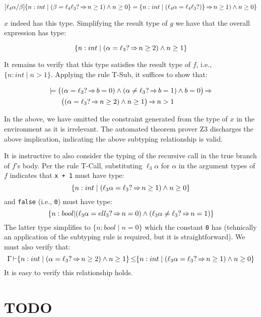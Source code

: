 \documentclass[runningheads]{llncs}
\begin{document}
\[
  [\ell_4\alpha/\beta]\{ n : int \mid (\beta = \ell_4\ell_3? \operatorname{\Rightarrow} n \geq 1) \wedge n \geq 0 \} = \{ n : int \mid (\ell_4\alpha = \ell_4\ell_3?)\} \operatorname{\Rightarrow} n \geq 1) \wedge n \geq 0 \}
\]

$x$ indeed has this type. Simplifying the result type of $g$ we have that the overall expression has type:

\[
  \{ n : int \mid (\alpha = \ell_3? \operatorname{\Rightarrow} n \geq 2) \wedge n \geq 1 \}
\]

It remains to verify that this type satisfies the result type of $f$, i.e.,
$\{ n : int \mid n > 1 \}$. Applying the rule T-Sub, it suffices to
show that:

\begin{align*}
  \models \big( & (\alpha = \ell_3? \operatorname{\Rightarrow} b = 0) \wedge (\alpha \neq \ell_3? \operatorname{\Rightarrow} b = 1) \wedge b = 0\big) \operatorname{\Rightarrow} \\
  & \big((\alpha  = \ell_3? \operatorname{\Rightarrow} n \geq 2) \wedge n \geq 1\big) \operatorname{\Rightarrow} n > 1
\end{align*}

In the above, we have omitted the constraint generated from the type of $x$ in the environment
as it is irrelevant. The automated theorem prover Z3 discharges the above implication,
indicating the above subtyping relationship is valid.

It is instructive to also consider the typing of the recursive call in
the true branch of $f$'s body. Per the rule T-Call, substituting
$\ell_3\alpha$ for $\alpha$ in the argument types of $f$ indicates that
\lstinline{x + 1} must have type:
\[
  \{ n : int \mid (\ell_3\alpha = \ell_3? \operatorname{\Rightarrow} n \geq 1) \wedge n \geq 0 \}
\]
and \lstinline{false} (i.e., \lstinline{0}) must have type:
\[
  \{ n : bool | (\ell_3\alpha = ell_3? \operatorname{\Rightarrow} n = 0) \wedge (\ell_3\alpha \neq \ell_3? \operatorname{\Rightarrow} n = 1) \}
\]
The latter type simplifies to $\{ n : bool \mid n = 0 \}$ which the constant \lstinline{0} has
(tehnically an application of the subtyping rule is required, but it is straightforward).
We must also verify that:
\[
  \Gamma \operatorname{\vdash} \{ n : int \mid (\alpha = \ell_3? \operatorname{\Rightarrow} n \geq 2) \wedge n \geq 1 \} \operatorname{\le} \{ n : int \mid (\ell_3\alpha = \ell_3? \operatorname{\Rightarrow} n \geq 1) \wedge n \geq 0 \}
\]
It is easy to verify this relationship holds.

\section{TODO}
\end{document}
